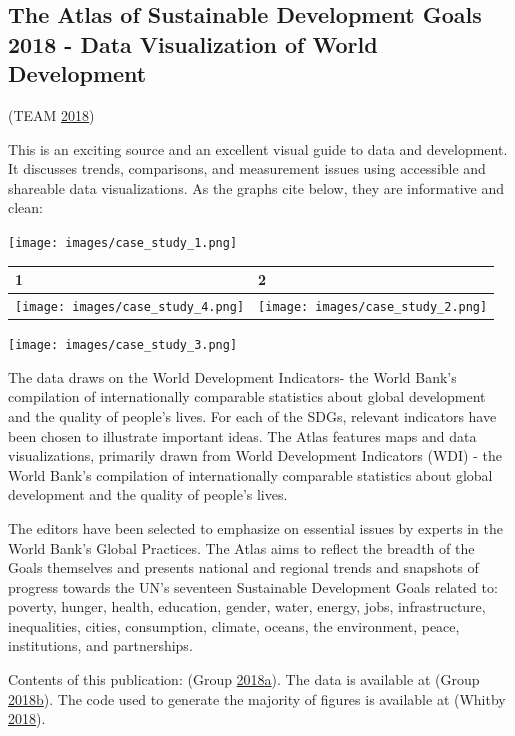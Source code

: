 \documentclass[]{book}
\begin{document}
\hypertarget{the-atlas-of-sustainable-development-goals-2018---data-visualization-of-world-development}{%
\subsection{The Atlas of Sustainable Development Goals 2018 - Data Visualization of World Development}\label{the-atlas-of-sustainable-development-goals-2018---data-visualization-of-world-development}}

(TEAM \protect\hyperlink{ref-world_bank_data}{2018})

This is an exciting source and an excellent visual guide to data and development. It discusses trends, comparisons, and measurement issues using accessible and shareable data visualizations. As the graphs cite below, they are informative and clean:

\texttt{[image: images/case\_study\_1.png]}

\begin{longtable}[]{@{}ll@{}}
\toprule
1 & 2\tabularnewline
\midrule
\endhead
\texttt{[image: images/case\_study\_4.png]} & \texttt{[image: images/case\_study\_2.png]}\tabularnewline
\bottomrule
\end{longtable}

\texttt{[image: images/case\_study\_3.png]}

The data draws on the World Development Indicators- the World Bank's compilation of internationally comparable statistics about global development and the quality of people's lives. For each of the SDGs, relevant indicators have been chosen to illustrate important ideas.
The Atlas features maps and data visualizations, primarily drawn from World Development Indicators (WDI) - the World Bank's compilation of internationally comparable statistics about global development and the quality of people's lives.

The editors have been selected to emphasize on essential issues by experts in the World Bank's Global Practices. The Atlas aims to reflect the breadth of the Goals themselves and presents national and regional trends and snapshots of progress towards the UN's seventeen Sustainable Development Goals related to: poverty, hunger, health, education, gender, water, energy, jobs, infrastructure, inequalities, cities, consumption, climate, oceans, the environment, peace, institutions, and partnerships.

Contents of this publication: (Group \protect\hyperlink{ref-worldbankpub}{2018}\protect\hyperlink{ref-worldbankpub}{a}).
The data is available at (Group \protect\hyperlink{ref-data_access}{2018}\protect\hyperlink{ref-data_access}{b}).
The code used to generate the majority of figures is available at (Whitby \protect\hyperlink{ref-worldbankcode}{2018}).
\end{document}

